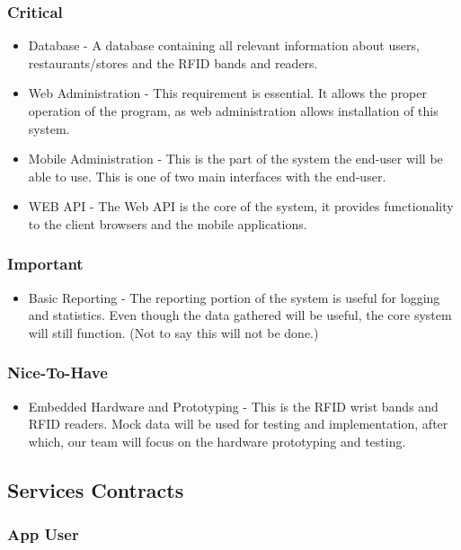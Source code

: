 \documentclass[11pt,titlepage]{article} %
\begin{document}
	\subsubsection{Critical}
\begin{itemize}
\item Database - A database containing all relevant information about users, restaurants/stores and the RFID bands and readers.
\item Web Administration - This requirement is essential. It allows the proper operation of the program, as web administration allows installation of this system.
\item Mobile Administration - This is the part of the system the end-user will be able to use. This is one of two main interfaces with the end-user.
\item WEB API - The Web API is the core of the system, it provides functionality to the client browsers and the mobile applications.
\end{itemize}

	\subsubsection{Important}
\begin{itemize}
\item Basic Reporting - The reporting portion of the system is useful for logging and statistics. Even though the data gathered will be useful, the core system will still function. (Not to say this will not be done.)
\end{itemize}

	\subsubsection{Nice-To-Have}
\begin{itemize}
\item Embedded Hardware and Prototyping - This is the RFID wrist bands and RFID readers. Mock data will be used for testing and implementation, after which, our team will focus on the hardware prototyping and testing.
\end{itemize}

\subsection{Services Contracts}
\subsubsection{App User}
\end{document}
